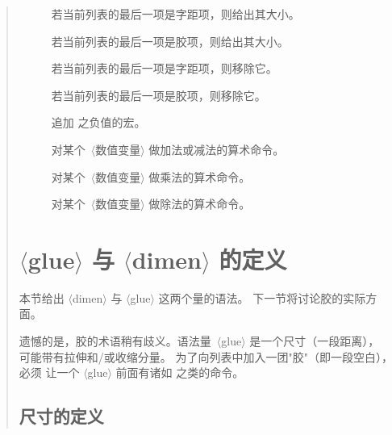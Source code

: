\documentclass[a4paper]{rapport3}
\def\gr#1{$\langle$#1$\rangle$}\def\key#1{{\tt#1}}
\newenvironment{disp}{\begin{quotation}}{\end{quotation}}
\newenvironment{inventory}{\begin{description}}{\end{description}}
\begin{document}
\begin{disp}
\begin{inventory}
\item [] 
      若当前列表的最后一项是字距项，则给出其大小。

\item [] 
      若当前列表的最后一项是胶项，则给出其大小。

\item [] 
      若当前列表的最后一项是字距项，则移除它。

\item [] 
      若当前列表的最后一项是胶项，则移除它。

\item []
      追加  之负值的宏。

\item [] 
      对某个~\gr{数值变量} 做加法或减法的算术命令。

\item [] 
      对某个~\gr{数值变量} 做乘法的算术命令。

\item [] 
      对某个~\gr{数值变量} 做除法的算术命令。


\end{inventory}



\section{\gr{glue} 与 \gr{dimen} 的定义}

本节给出
\gr{dimen} 与 \gr{glue} 这两个量的语法。
下一节将讨论胶的实际方面。

遗憾的是，胶的术语稍有歧义。语法量~\gr{glue} 是一个尺寸（一段距离），
\mdqon
可能带有拉伸和/或收缩分量。
\mdqoff
为了向列表中加入一团"胶"（即一段空白），必须
让一个 \gr{glue} 前面有诸如  之类的命令。


\subsection{尺寸的定义}


\end{disp}
\end{document}
